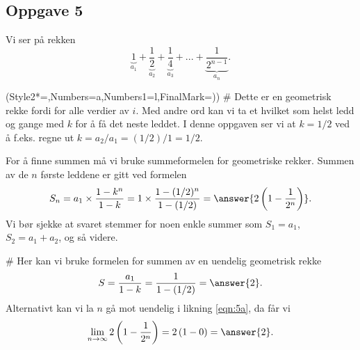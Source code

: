 \subsection*{Oppgave 5}
Vi ser på rekken
\begin{equation*}
	\underset{a_1}{\underbrace{1}} + \underset{a_2}{\underbrace{\frac{1}{2}}} + \underset{a_3}{\underbrace{\frac{1}{4}}} + ... + \underset{a_n}{\underbrace{\frac{1}{2^{n-1}}}}.
\end{equation*}
\begin{easylist}[enumerate]
	\ListProperties(Style2*=,Numbers=a,Numbers1=l,FinalMark={)})
	# Dette er en geometrisk rekke fordi  for alle verdier av $i$.
	Med andre ord kan vi ta et hvilket som helst ledd og gange med $k$ for å få det neste leddet. I denne oppgaven ser vi at
	$k = 1/2$ ved å f.eks. regne ut $k = a_2 / a_{1} = (1/2)/1 = 1/2$.
	
	For å finne summen må vi bruke summeformelen for geometriske rekker. 
	Summen av de $n$ første leddene er gitt ved formelen
	\begin{equation}
	\label{eqn:5a}
		S_n = a_1 \times \frac{1-k^n}{1-k} = 1 \times \frac{1-(1/2)^n}{1-(1/2)} = \answer{2 \left( 1-\frac{1}{2^n} \right)}.
	\end{equation}
	Vi bør sjekke at svaret stemmer for noen enkle summer som $S_1 = a_1$, $S_2 = a_1 + a_2$, og så videre.
	
	# Her kan vi bruke formelen for summen av en uendelig geometrisk rekke
	\begin{equation*}
		S = \frac{a_1}{1 - k} = \frac{1}{1 - (1/2)} = \answer{2}.
	\end{equation*}
	Alternativt kan vi la $n$ gå mot uendelig i likning \eqref{eqn:5a}, da får vi
	\begin{equation*}
		\lim_{n \to \infty } 2 \left( 1-\frac{1}{2^n} \right)= 2 \left( 1-0 \right) = \answer{2}.
	\end{equation*}
\end{easylist}

